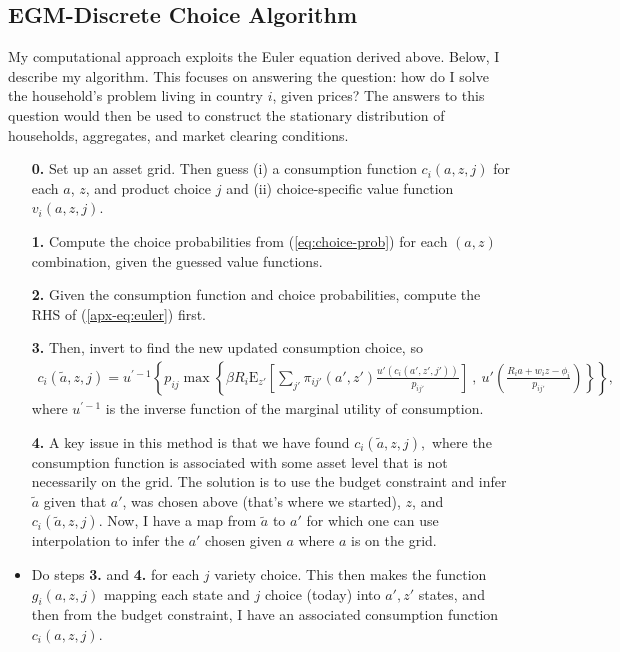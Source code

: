 \documentclass[12pt,pdftex]{article}
\begin{document}
\begin{onehalfspacing}
\subsection{EGM-Discrete Choice Algorithm}

My computational approach exploits the Euler equation derived above. Below, I describe my algorithm. This focuses on answering the question: how do I solve the household's problem living in country $i$, given prices? The answers to this question would then be used to construct the stationary distribution of households, aggregates, and market clearing conditions.
\begin{itemize}
\item[\textbf{0.}] Set up an asset grid. Then guess (i) a consumption function $c_{i}(a,z,j)$ for each $a$, $z$, and product choice $j$ and (ii) choice-specific value function $v_{i}(a,z,j)$.

\item[\textbf{1.}] Compute the choice probabilities from (\ref{eq:choice-prob}) for each $(a,z)$ combination, given the guessed value functions.

\item[\textbf{2.}] Given the consumption function and choice probabilities, compute the RHS of (\ref{apx-eq:euler}) first.

\item[\textbf{3.}] Then, invert to find the new updated consumption choice, so
{\small
\begin{align}
c_{i}(\tilde a, z, j) = u^{' -1}\left\{ p_{ij} \max \left\{ \beta R_{i} \mathrm{E}_{z'} \left[ \sum_{j'} \pi_{ij'}(a', z') \frac{u'(c_{i}(a', z',j'))}{p_{ij'}} \right] \ , \  u' \left( \frac{R_i a + w_i z - \phi_{i}}{p_{ij'}} \right) \right \} \right \},
\end{align}}
where $u^{' -1}$ is the inverse function of the marginal utility of consumption.

\item[\textbf{4.}] A key issue in this method is that we have found  $c_{i}(\tilde a, z, j),$ where the consumption function is associated with some asset level that is not necessarily on the grid. The solution is to use the budget constraint and infer $\tilde a$ given that $a'$, was chosen above (that's where we started), $z$, and $c_{i}(\tilde a, z, j)$. Now, I have a map from $\tilde a$ to $a'$ for which one can use interpolation to infer the $a'$ chosen given $a$ where $a$ is on the grid.

\item Do steps \textbf{3.} and \textbf{4.} for each $j$ variety choice. This then makes the function $g_{i}(a,z,j)$ mapping each state and $j$ choice (today) into $a', z'$ states, and then from the budget constraint, I have an associated consumption function $c_{i}(a,z,j)$.


\end{itemize}
\end{onehalfspacing}
\end{document}
